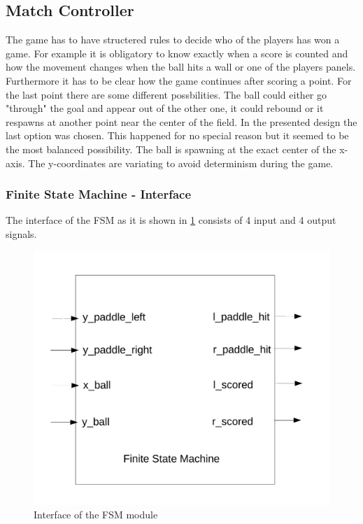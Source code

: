     \subsection{Match Controller}
    

The game has to have structered rules to decide who of the players has won a game. For example it is obligatory to know exactly when a score is counted and how the movement changes when the ball hits a wall or one of the players panels. Furthermore it has to be clear how the game continues after scoring a point. \newline 
For the last point there are some different possbilities. The ball could either go "through" the goal and appear out of the other one, it could rebound or it respawns at another point near the center of the field. In the presented design the last option was chosen. This happened for no special reason but it seemed to be the most balanced possibility. The ball is spawning at the exact center of the x-axis. The y-coordinates are variating to avoid determinism during the game.  

\subsubsection{Finite State Machine - Interface}
The interface of the FSM as it is shown in \ref{interface_fsm} consists of 4 input and 4 output signals. 
\begin{figure}[h]
    \centering
	\includegraphics[scale=0.5]{images/block_fsm.pdf}

\caption{Interface of the FSM module}
\label{interface_fsm}
\end{figure}

